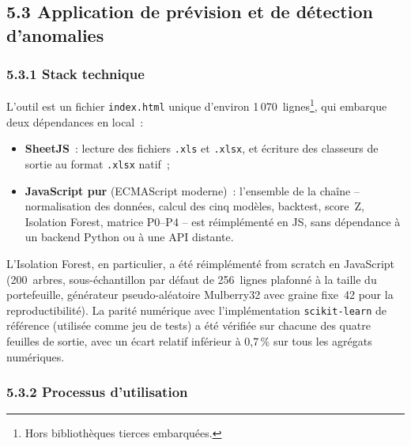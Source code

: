 \subsection*{5.3 \quad Application de pr\'evision et de d\'etection d'anomalies}

\subsubsection*{5.3.1 \quad Stack technique}

L'outil est un fichier \texttt{index.html} unique d'environ
1\,070~lignes\footnote{Hors biblioth\`eques tierces embarqu\'ees.}, qui embarque
deux d\'ependances en local~:

\begin{itemize}
    \item \textbf{SheetJS}~: lecture des fichiers \texttt{.xls} et \texttt{.xlsx},
    et \'ecriture des classeurs de sortie au format \texttt{.xlsx} natif~;
    \item \textbf{JavaScript pur} (ECMAScript moderne)~: l'ensemble de la
    cha\^ine -- normalisation des donn\'ees, calcul des cinq mod\`eles,
    backtest, score~Z, Isolation Forest, matrice P0--P4 -- est r\'eimpl\'ement\'e
    en JS, sans d\'ependance \`a un backend Python ou \`a une API distante.
\end{itemize}

L'Isolation Forest, en particulier, a \'et\'e r\'eimpl\'ement\'e \og from
scratch \fg{} en JavaScript (200~arbres, sous-\'echantillon par d\'efaut
de 256~lignes plafonn\'e \`a la taille du portefeuille,
g\'en\'erateur pseudo-al\'eatoire Mulberry32 avec graine fixe~42 pour la
reproductibilit\'e). La parit\'e num\'erique avec l'impl\'ementation
\texttt{scikit-learn} de r\'ef\'erence (utilis\'ee comme jeu de tests) a
\'et\'e v\'erifi\'ee sur chacune des quatre feuilles de sortie, avec un
\'ecart relatif inf\'erieur \`a 0{,}7\,\% sur tous les agr\'egats num\'eriques.

\subsubsection*{5.3.2 \quad Processus d'utilisation}

